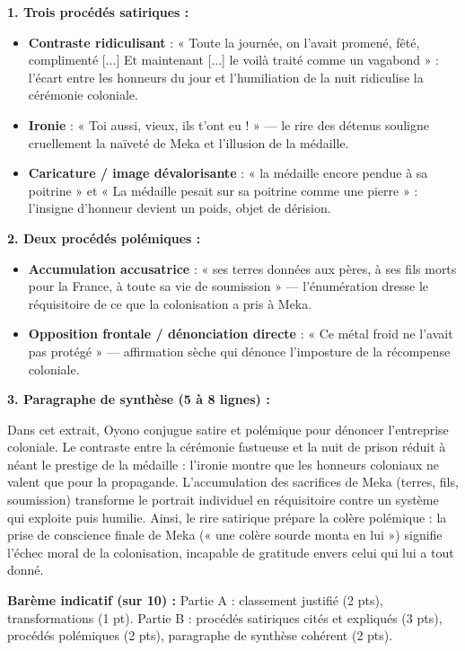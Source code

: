 \documentclass[11pt]{article}
\begin{document}
\begin{corrige}
\textbf{1. Trois procédés satiriques :}
\begin{itemize}
\item \textbf{Contraste ridiculisant} : « Toute la journée, on l'avait promené, fêté, complimenté [...] Et maintenant [...] le voilà traité comme un vagabond » : l'écart entre les honneurs du jour et l'humiliation de la nuit ridiculise la cérémonie coloniale.
\item \textbf{Ironie} : « Toi aussi, vieux, ils t'ont eu ! » — le rire des détenus souligne cruellement la naïveté de Meka et l'illusion de la médaille.
\item \textbf{Caricature / image dévalorisante} : « la médaille encore pendue à sa poitrine » et « La médaille pesait sur sa poitrine comme une pierre » : l'insigne d'honneur devient un poids, objet de dérision.
\end{itemize}
\textbf{2. Deux procédés polémiques :}
\begin{itemize}
\item \textbf{Accumulation accusatrice} : « ses terres données aux pères, à ses fils morts pour la France, à toute sa vie de soumission » — l'énumération dresse le réquisitoire de ce que la colonisation a pris à Meka.
\item \textbf{Opposition frontale / dénonciation directe} : « Ce métal froid ne l'avait pas protégé » — affirmation sèche qui dénonce l'imposture de la récompense coloniale.
\end{itemize}
\textbf{3. Paragraphe de synthèse (5 à 8 lignes) :}

Dans cet extrait, Oyono conjugue satire et polémique pour dénoncer l'entreprise coloniale. Le contraste entre la cérémonie fastueuse et la nuit de prison réduit à néant le prestige de la médaille : l'ironie montre que les honneurs coloniaux ne valent que pour la propagande. L'accumulation des sacrifices de Meka (terres, fils, soumission) transforme le portrait individuel en réquisitoire contre un système qui exploite puis humilie. Ainsi, le rire satirique prépare la colère polémique : la prise de conscience finale de Meka (« une colère sourde monta en lui ») signifie l'échec moral de la colonisation, incapable de gratitude envers celui qui lui a tout donné.

\textbf{Barème indicatif (sur 10) :} Partie A : classement justifié (2 pts), transformations (1 pt). Partie B : procédés satiriques cités et expliqués (3 pts), procédés polémiques (2 pts), paragraphe de synthèse cohérent (2 pts).
\end{corrige}
\end{document}
